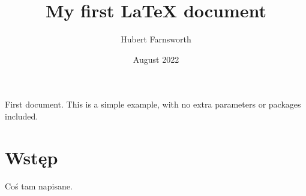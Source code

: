 \documentclass{SGGW-thesis}
\title{My first LaTeX document}
\author{Hubert Farnsworth}
\date{August 2022}
\begin{document}
\maketitle
\statementpage
\abstractpage
First document. This is a simple example, with no 
extra parameters or packages included.
{
  \doublespacing
  \tableofcontents
}
\startchapterfromoddpage %

\chapter{Wstęp}
Coś tam napisane.
\beforelastpage
\end{document}
